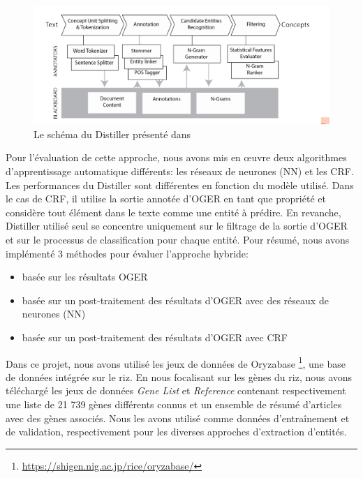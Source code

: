 \begin{figure}[!ht]
\begin{center}
	\includegraphics[width=1\textwidth]{Figures/distiller.png}
\end{center}
\label{distiller}
\caption[Le schéma du Distiller ]{ Le schéma du Distiller présenté dans ~\cite{Basaldella2017}}
\end{figure}

Pour l'évaluation de cette approche, nous avons mis en œuvre deux algorithmes d’apprentissage automatique différents: les réseaux de neurones (NN) et les CRF. Les performances du Distiller sont différentes en fonction du modèle utilisé. Dans le cas de CRF, il utilise la sortie annotée d'OGER en tant que propriété et considère tout élément dans le texte comme une entité à prédire. En revanche, Distiller utilisé seul se concentre uniquement sur le filtrage de la sortie d'OGER et sur le processus de classification pour chaque entité. Pour résumé, nous avons implémenté 3 méthodes pour évaluer l'approche hybride: \\
\begin{itemize}
\item basée sur les résultats OGER
\item basée sur un post-traitement des résultats d'OGER avec des réseaux de neurones (NN) 
\item basée sur un post-traitement des résultats d'OGER avec CRF\\
\end{itemize}


Dans ce projet, nous avons utilisé les jeux de données de Oryzabase \footnote {\url{https://shigen.nig.ac.jp/rice/oryzabase/}}, une base de données intégrée sur le riz. En nous focalisant sur les gènes du riz, nous avons téléchargé les jeux de données \textit{Gene List} et \textit{Reference} contenant respectivement une liste de 21 739 gènes différents connus et un ensemble de résumé d'articles avec des gènes associés. Nous les avons utilisé comme données d'entraînement et de validation, respectivement pour les diverses approches d'extraction d'entités.

